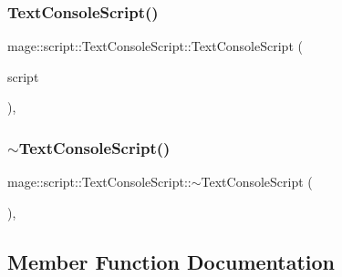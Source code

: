 \hypertarget{classmage_1_1script_1_1_text_console_script_a46052af67069fef12a8ff9de75cce382}{}\label{classmage_1_1script_1_1_text_console_script_a46052af67069fef12a8ff9de75cce382} 
\subsubsection{\texorpdfstring{Text\+Console\+Script()}{TextConsoleScript()}\hspace{0.1cm}{\footnotesize\ttfamily [3/3]}}
{\footnotesize\ttfamily mage\+::script\+::\+Text\+Console\+Script\+::\+Text\+Console\+Script (\begin{DoxyParamCaption}\item[{\hyperlink{classmage_1_1script_1_1_text_console_script}{Text\+Console\+Script} \&\&}]{script }\end{DoxyParamCaption})\hspace{0.3cm}{\ttfamily [default]}, {\ttfamily [noexcept]}}

\hypertarget{classmage_1_1script_1_1_text_console_script_af0959c8a4f21bb4f9b5553dffc5710b9}{}\label{classmage_1_1script_1_1_text_console_script_af0959c8a4f21bb4f9b5553dffc5710b9} 
\subsubsection{\texorpdfstring{$\sim$\+Text\+Console\+Script()}{~TextConsoleScript()}}
{\footnotesize\ttfamily mage\+::script\+::\+Text\+Console\+Script\+::$\sim$\+Text\+Console\+Script (\begin{DoxyParamCaption}{ }\end{DoxyParamCaption})\hspace{0.3cm}{\ttfamily [virtual]}, {\ttfamily [default]}}



\subsection{Member Function Documentation}
\hypertarget{classmage_1_1script_1_1_text_console_script_a274764deea9f02ec77515680456548d6}{}\label{classmage_1_1script_1_1_text_console_script_a274764deea9f02ec77515680456548d6} 
